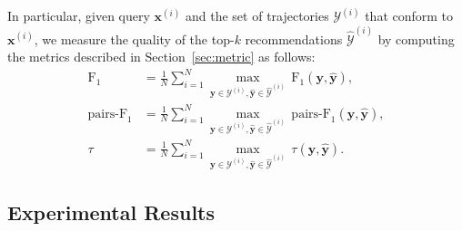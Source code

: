 In particular, given query $\mathbf{x}^{(i)}$ and the set of trajectories $\mathcal{Y}^{(i)}$ that conform to $\mathbf{x}^{(i)}$,
we measure the quality of the top-$k$ recommendations $\hat{\mathcal{Y}}^{(i)}$ 
by computing the metrics described in Section~\ref{sec:metric} as follows:
\begin{align*}
\text{F}_1 
&= \frac{1}{N} \sum_{i=1}^N \max_{\mathbf{y} \in \mathcal{Y}^{(i)}, \hat{\mathbf{y}} \in \hat{\mathcal{Y}}^{(i)}} \, 
   \text{F}_1(\mathbf{y}, \hat{\mathbf{y}}), \\
\text{pairs-F}_1 
&= \frac{1}{N} \sum_{i=1}^N \max_{\mathbf{y} \in \mathcal{Y}^{(i)}, \hat{\mathbf{y}} \in \hat{\mathcal{Y}}^{(i)}} \, 
   \text{pairs-F}_1(\mathbf{y}, \hat{\mathbf{y}}), \\
\tau 
&= \frac{1}{N} \sum_{i=1}^N \max_{\mathbf{y} \in \mathcal{Y}^{(i)}, \hat{\mathbf{y}} \in \hat{\mathcal{Y}}^{(i)}} \, 
   \tau(\mathbf{y}, \hat{\mathbf{y}}).
\end{align*}



\subsection{Experimental Results}
\label{sec:result}

